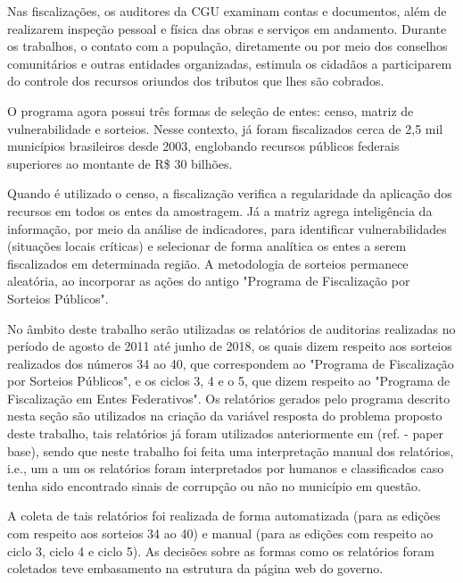 Nas fiscalizações, os auditores da CGU examinam contas e documentos, além de realizarem inspeção pessoal e física das obras e serviços em andamento. Durante os trabalhos, o contato com a população, diretamente ou por meio dos conselhos comunitários e outras entidades organizadas, estimula os cidadãos a participarem do controle dos recursos oriundos dos tributos que lhes são cobrados.

O programa agora possui três formas de seleção de entes: censo, matriz de vulnerabilidade e sorteios. Nesse contexto, já foram fiscalizados cerca de 2,5 mil municípios brasileiros desde 2003, englobando recursos públicos federais superiores ao montante de R\$ 30 bilhões.

Quando é utilizado o censo, a fiscalização verifica a regularidade da aplicação dos recursos em todos os entes da amostragem. Já a matriz agrega inteligência da informação, por meio da análise de indicadores, para identificar vulnerabilidades (situações locais críticas) e selecionar de forma analítica os entes a serem fiscalizados em determinada região. A metodologia de sorteios permanece aleatória, ao incorporar as ações do antigo "Programa de Fiscalização por Sorteios Públicos".

No âmbito deste trabalho serão utilizadas os relatórios de auditorias realizadas no período de agosto de 2011 até junho de 2018, os quais dizem respeito aos sorteios realizados dos números 34 ao 40, que correspondem ao "Programa de Fiscalização por Sorteios Públicos", e os ciclos 3, 4 e o 5, que dizem respeito ao "Programa de Fiscalização em Entes Federativos". Os relatórios gerados pelo programa descrito nesta seção são utilizados na criação da variável resposta do problema proposto deste trabalho, tais relatórios já foram utilizados anteriormente em (ref. - paper base), sendo que neste trabalho foi feita uma interpretação manual dos relatórios, i.e., um a um os relatórios foram interpretados por humanos e classificados caso tenha sido encontrado sinais de corrupção ou não no município em questão.

A coleta de tais relatórios foi realizada de forma automatizada (para as edições com respeito aos sorteios 34 ao 40) e manual (para as edições com respeito ao ciclo 3, ciclo 4 e ciclo 5). As decisões sobre as formas como os relatórios foram coletados teve embasamento na estrutura da página web do governo.

